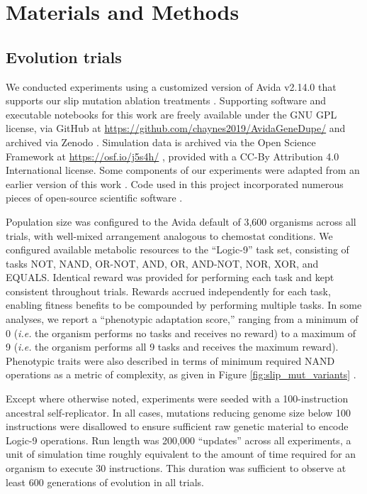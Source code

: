 \section{Materials and Methods} \label{sec:methods}

\subsection{Evolution trials}

We conducted experiments using a customized version of Avida v2.14.0 that supports our slip mutation ablation treatments \citep{Ofria:2009avida}.
Supporting software and executable notebooks for this work are freely available under the GNU GPL license, via GitHub at \url{https://github.com/chaynes2019/AvidaGeneDupe/} and archived via Zenodo \citep{haynes_2025,https://doi.org/10.25495/7gxk-rd71}.
Simulation data is archived via the Open Science Framework at \url{https://osf.io/j5s4h/} \citep{Moreno_Haynes_2025,foster2017open}, provided with a CC-By Attribution 4.0 International license.
Some components of our experiments were adapted from an earlier version of this work \citep{lalejini2017gene}.
Code used in this project incorporated numerous pieces of open-source scientific software \citep{2020SciPy-NMeth,harris2020array,reback2020pandas,mckinney-proc-scipy-2010,waskom2021seaborn,hunter2007matplotlib,moreno2023teeplot,r_core_team_r:_2015}.

Population size was configured to the Avida default of 3,600 organisms across all trials, with well-mixed arrangement analogous to chemostat conditions.
We configured available metabolic resources to the ``Logic-9'' task set, consisting of tasks NOT, NAND, OR-NOT, AND, OR, AND-NOT, NOR, XOR, and EQUALS.
Identical reward was provided for performing each task and kept consistent throughout trials.
Rewards accrued independently for each task, enabling fitness benefits to be compounded by performing multiple tasks.
In some analyses, we report a ``phenotypic adaptation score,'' ranging from a minimum of 0 (\textit{i.e.} the organism performs no tasks and receives no reward) to a maximum of 9 (\textit{i.e.} the organism performs all 9 tasks and receives the maximum reward).
Phenotypic traits were also described in terms of minimum required NAND operations as a metric of complexity, as given in Figure \ref{fig:slip_mut_variants} \citep{lenski2003evolutionary}.

Except where otherwise noted, experiments were seeded with a 100-instruction ancestral self-replicator.
In all cases, mutations reducing genome size below 100 instructions were disallowed to ensure sufficient raw genetic material to encode Logic-9 operations.
Run length was 200,000 ``updates'' across all experiments, a unit of simulation time roughly equivalent to the amount of time required for an organism to execute 30 instructions.
This duration was sufficient to observe at least 600 generations of evolution in all trials.

